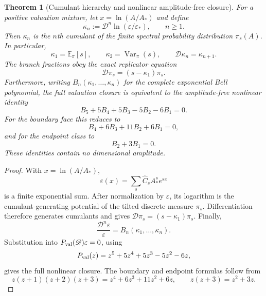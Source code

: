 \documentclass[aps,prd,reprint,onecolumn,nofootinbib,superscriptaddress,showkeys]{revtex4-2}
\numberwithin{equation}{section}
\theoremstyle{definition}
\theoremstyle{plain}
\newtheorem{theorem}{Theorem}[section]
\newcommand{\Dil}{\mathscr D}
\begin{document}
\begin{theorem}[Cumulant hierarchy and nonlinear amplitude-free closure]\label{thm:cumulants}
For a positive valuation mixture, let $x=\ln(A/A_*)$ and define
\begin{equation}
\kappa_n:=\Dil^n\ln(\varepsilon/\varepsilon_*),
\qquad n\ge1.
\end{equation}
Then $\kappa_n$ is the $n$th cumulant of the finite spectral probability distribution $\pi_s(A)$.  In particular,
\begin{equation}
\kappa_1=\mathbb E_\pi[s],
\qquad
\kappa_2=\operatorname{Var}_\pi(s),
\qquad
\Dil\kappa_n=\kappa_{n+1}.
\end{equation}
The branch fractions obey the exact replicator equation
\begin{equation}
\boxed{
\Dil\pi_s=(s-\kappa_1)\pi_s.
}
\end{equation}
Furthermore, writing $B_n(\kappa_1,\ldots,\kappa_n)$ for the complete exponential Bell polynomial, the full valuation closure is equivalent to the amplitude-free nonlinear identity
\begin{equation}
\boxed{
B_5+5B_4+5B_3-5B_2-6B_1=0.
}
\end{equation}
For the boundary face this reduces to
\begin{equation}
\boxed{
B_4+6B_3+11B_2+6B_1=0,
}
\end{equation}
and for the endpoint class to
\begin{equation}
\boxed{
B_2+3B_1=0.
}
\end{equation}
These identities contain no dimensional amplitude.
\end{theorem}

\begin{proof}
With $x=\ln(A/A_*)$,
\[
\varepsilon(x)=\sum_s \widehat C_sA_*^s e^{sx}
\]
is a finite exponential sum.  After normalization by $\varepsilon$, its logarithm is the cumulant-generating potential of the tilted discrete measure $\pi_s$.  Differentiation therefore generates cumulants and gives $\Dil\pi_s=(s-\kappa_1)\pi_s$.  Finally,
\[
\frac{\Dil^n\varepsilon}{\varepsilon}=B_n(\kappa_1,\ldots,\kappa_n).
\]
Substitution into $P_{\rm val}(\Dil)\varepsilon=0$, using
\[
P_{\rm val}(z)=z^5+5z^4+5z^3-5z^2-6z,
\]
gives the full nonlinear closure.  The boundary and endpoint formulas follow from
\[
z(z+1)(z+2)(z+3)=z^4+6z^3+11z^2+6z,
\qquad
z(z+3)=z^2+3z.
\]
\end{proof}
\end{document}
